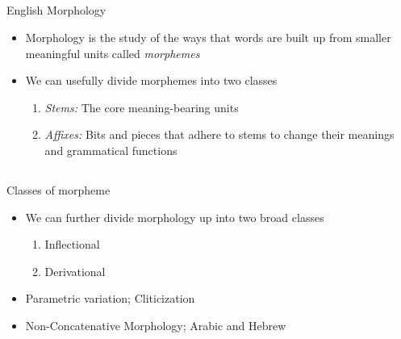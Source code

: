\documentclass[9pt,xcolor=pdftex,dvipsnames,table]{beamer}
\begin{document}
\subsection{}
\begin{frame}{English Morphology}
	\begin{itemize}
		\item Morphology is the study of the ways that words are built up from smaller meaningful units called \emph{morphemes}
		\item We can usefully divide morphemes into two classes
		\vspace{1cm}
		\begin{enumerate}
			\item \emph{Stems:} The core meaning-bearing units
			\item \emph{Affixes:} Bits and pieces that adhere to stems to change their meanings and grammatical functions
		\end{enumerate}
	\end{itemize}
\end{frame}

\subsection{}
\begin{frame}{Classes of morpheme}
	\begin{itemize}
		\item We can further divide morphology up into two broad classes
	\vspace{.5cm}
	\begin{enumerate}
		\item Inflectional
		\item Derivational
	\end{enumerate}
	\vspace{.5cm}

	\item Parametric variation; Cliticization
	\item Non-Concatenative Morphology; Arabic and Hebrew
	\end{itemize}
\end{frame}
\end{document}
